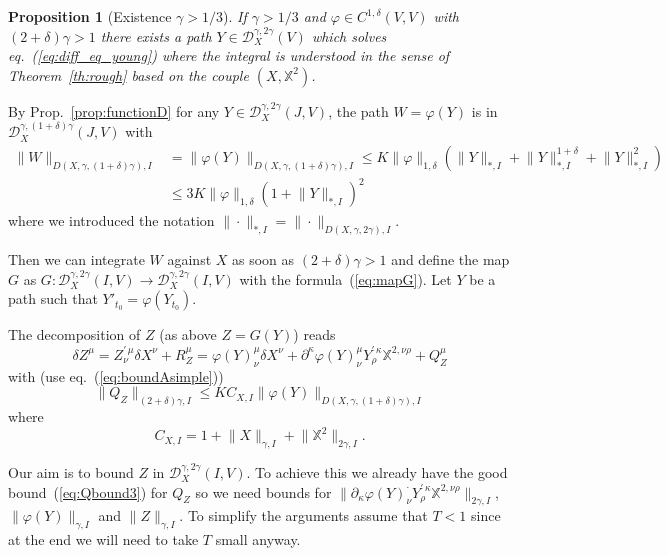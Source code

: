 \documentclass[a4paper,12pt,reqno]{amsproc}
\newcommand{\der}{\delta\!}
\newcommand{\XX}{\mathbb{X}}
\newcommand{\DD}{\mathcal{D}}
\newcommand{\norm}[1]{\lVert #1\rVert}
\newtheorem{proposition}{Proposition}
\begin{document}
\begin{proposition}[Existence $\gamma > 1/3$]
\label{eq:existence_rough} 
If $\gamma > 1/3$ and $\varphi \in C^{1,\delta}(V,V)$ with $(2+\delta)\gamma>1$
there exists a path $Y \in
\DD^{\gamma,2\gamma}_X(V)$ which solves eq.~(\ref{eq:diff_eq_young})
where the integral is understood in the sense of
Theorem~\ref{th:rough} based on the couple $(X,\mathbb{X}^2)$.    
\end{proposition}
\proof
By Prop.~\ref{prop:functionD} for any  $Y \in \DD_{X}^{\gamma,2\gamma}(J,V)$,  
 the path $W = \varphi(Y)$ is in
 $\DD_{X}^{\gamma,(1+\delta)\gamma}(J,V)$ with
\begin{equation}
\label{eq:boundWxx}
\begin{split}
\norm{W}_{D(X,\gamma,(1+\delta)\gamma),I} & =  \norm{\varphi(Y)}_{D(X,\gamma,(1+\delta)\gamma),I} \le  
K \|\varphi\|_{1,\delta}(
\norm{Y}_{*,I} + \norm{Y}^{1+\delta}_{*,I} + \norm{Y}^{2}_{*,I})
\\ & 
\le 3 K \|\varphi\|_{1,\delta} (1+\norm{Y}_{*,I})^2  
\end{split}
\end{equation}
where we introduced the notation  $\|\cdot\|_{*,I} = \|\cdot \|_{D(X,\gamma,2\gamma),I}$.

Then we can integrate $W$
 against $X$ as soon as $(2+\delta)\gamma > 1$ and  define the map
 $G$  as   $G :
\DD^{\gamma,2\gamma}_X(I,V) \to
\DD^{\gamma,2\gamma}_X(I,V)$ with the formula~(\ref{eq:mapG}). Let $Y$
 be a path such that $Y'_{t_0} = \varphi(Y_{t_0})$.

The decomposition of $Z$ (as above  $Z = G(Y)$) reads
\begin{equation*}
\der Z^\mu = Z^{\prime\,\mu}_\nu \der X^\nu + R_Z^\mu = \varphi(Y)^{\mu}_{\nu} \der X^\nu + 
\partial^\kappa \varphi(Y)^{\mu}_{\nu} Y^{\prime\,\kappa}_{\rho} \XX^{2,\nu\rho} + Q^\mu_Z
\end{equation*}
with (use eq.~(\ref{eq:boundAsimple}))
\begin{equation}
\label{eq:Qbound3}
\norm{Q_Z}_{(2+\delta)\gamma,I} \le K C_{X,I}
\norm{\varphi(Y)}_{D(X,\gamma,(1+\delta)\gamma),I} 
\end{equation}
where
$$
C_{X,I} = 1+\norm{X}_{\gamma,I}+\norm{\mathbb{X}^2}_{2\gamma,I}.
$$

Our aim is to bound $Z$ in $\DD_X^{\gamma,2\gamma}(I,V)$. To achieve
this we already have the good bound~(\ref{eq:Qbound3}) for $Q_Z$ so we
need  bounds  for $\norm{\partial_\kappa \varphi(Y)^{\cdot}_{\nu}
 Y^{\prime\,\kappa}_{\rho} \XX^{2,\nu\rho}}_{2\gamma,I}$,
$\norm{\varphi(Y)}_{\gamma,I}$ and $\norm{Z}_{\gamma,I}$. 
To simplify the arguments assume that
$T < 1$ since at the end we will need to take $T$ small anyway.
\end{document}
